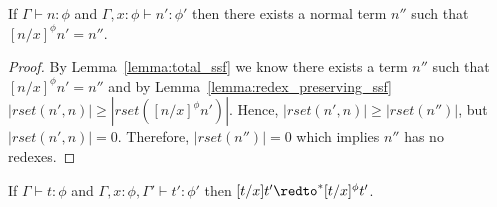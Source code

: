 \begin{lemma}
  \label{corollary:normalization_preserving_ssf}
  If $\Gamma \vdash n:\phi$ and $\Gamma, x:\phi \vdash n':\phi'$ then there exists a normal term $n''$ 
  such that $[n/x]^\phi n' = n''$.
\end{lemma}
\begin{proof}
  By Lemma~\ref{lemma:total_ssf} we know there exists a term $n''$ such that $[n/x]^\phi n' = n''$ and by 
Lemma~\ref{lemma:redex_preserving_ssf} 
$|rset(n', n)| \geq |rset([n/x]^\phi n')|$.  Hence, $|rset(n', n)| \geq |rset(n'')|$, but
$|rset(n', n)| = 0$.  Therefore, $|rset(n'')| = 0$ which implies $n''$ has no redexes.  
\end{proof}

\begin{lemma}
  \label{lemma:soundness_reduction_ssf}
  If $\Gamma \vdash t : \phi$ and $\Gamma, x:\phi, \Gamma' \vdash t':\phi'$ then
  $[t/x]t' \redto^* [t/x]^\phi t'$.
\end{lemma}
